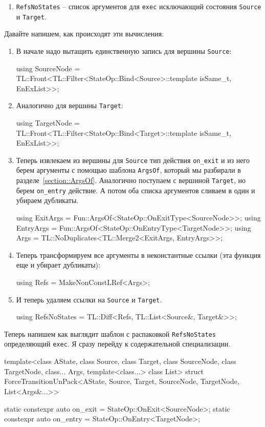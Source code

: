 \documentclass{article}
\begin{document}
{\begin{enumerate}
\item \verb"RefsNoStates" -- список аргументов для \verb"exec" исключающий состояния \verb"Source" и \verb"Target".
\end{enumerate}
Давайте напишем, как происходят эти вычисления:
\begin{enumerate}
\item В начале надо вытащить единственную запись для вершины \verb"Source":
\begin{cppcode}[\nonumbers]
using SourceNode =
    TL::Front<TL::Filter<StateOp::Bind<Source>::template isSame_t, EnExList>>;
\end{cppcode}

\item Аналогично для вершины \verb"Target":
\begin{cppcode}[\nonumbers]
using TargetNode =
    TL::Front<TL::Filter<StateOp::Bind<Target>::template isSame_t, EnExList>>;
\end{cppcode}

\item  Теперь извлекаем из вершины для \verb"Source" тип действия \verb"on_exit" и из него берем аргументы с помощью шаблона \verb"ArgsOf", который мы разбирали в разделе~\ref{section::ArgsOf}.
Аналогично поступаем с вершиной \verb"Target", но берем \verb"on_entry" действие.
А потом оба списка аргументов сливаем в один и убираем дубликаты.
\begin{cppcode}[\nonumbers]
using ExitArgs = Fun::ArgsOf<StateOp::OnExitType<SourceNode>>;
using EntryArgs = Fun::ArgsOf<StateOp::OnEntryType<TargetNode>>;
using Args = TL::NoDuplicates<TL::Merge2<ExitArgs, EntryArgs>>;
\end{cppcode}

\item Теперь трансформируем все аргументы в неконстантные ссылки (эта функция еще и убирает дубликаты):
\begin{cppcode}[\nonumbers]
using Refs = MakeNonConstLRef<Args>;
\end{cppcode}

\item И теперь удаляем ссылки на \verb"Source" и \verb"Target".
\begin{cppcode}[\nonumbers]
using RefsNoStates = TL::Diff<Refs, TL::List<Source&, Target&>>;
\end{cppcode}
\end{enumerate}
Теперь напишем как выглядит шаблон с распаковкой \verb"RefsNoStates" определяющий \verb"exec".
Я сразу перейду к содержательной специализации.
\begin{cppcode}
template<class AState, class Source, class Target, class SourceNode,
         class TargetNode, class... Args, template<class...> class List>
struct ForceTransitionUnPack<AState, Source, Target, SourceNode, TargetNode,
                             List<Args&...>> {
  static constexpr auto on_exit = StateOp::OnExit<SourceNode>;
  static constexpr auto on_entry = StateOp::OnEntry<TargetNode>;

}
\end{cppcode}}
\end{document}
